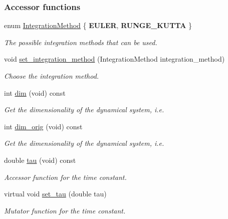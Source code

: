 \subsubsection*{Accessor functions}
\begin{DoxyCompactItemize}
\item 
enum \hyperlink{group__DynamicalSystems_ga9eca50997f7f604b063d2cb1874f5fef}{Integration\+Method} \{ {\bfseries E\+U\+L\+E\+R}, 
{\bfseries R\+U\+N\+G\+E\+\_\+\+K\+U\+T\+T\+A}
 \}
\begin{DoxyCompactList}\small\item\em The possible integration methods that can be used. \end{DoxyCompactList}\item 
void \hyperlink{group__DynamicalSystems_ga07a2df4cc46a521ab81c614d79b33669}{set\+\_\+integration\+\_\+method} (Integration\+Method integration\+\_\+method)
\begin{DoxyCompactList}\small\item\em Choose the integration method. \end{DoxyCompactList}\item 
int \hyperlink{group__DynamicalSystems_ga6f628f7f4ed9d77bf69f5b8560b98f18}{dim} (void) const 
\begin{DoxyCompactList}\small\item\em Get the dimensionality of the dynamical system, i.\+e. \end{DoxyCompactList}\item 
int \hyperlink{group__DynamicalSystems_ga93d7cbbf2e471b00f124e41706405a05}{dim\+\_\+orig} (void) const 
\begin{DoxyCompactList}\small\item\em Get the dimensionality of the dynamical system, i.\+e. \end{DoxyCompactList}\item 
double \hyperlink{group__DynamicalSystems_ga50eec7ad4c9664b5809ace45b22200d5}{tau} (void) const 
\begin{DoxyCompactList}\small\item\em Accessor function for the time constant. \end{DoxyCompactList}\item 
virtual void \hyperlink{group__DynamicalSystems_ga91155da280310b176cbd5fc1627820c7}{set\+\_\+tau} (double tau)
\begin{DoxyCompactList}\small\item\em Mutator function for the time constant. \end{DoxyCompactList}\item 

\end{DoxyCompactItemize}
